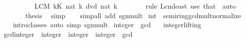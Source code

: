 \begin{isabellebody}
\ \ \isamarkupfalse%
\ {\isacharminus}{\kern0pt}\isanewline
\ \ \ \ \isamarkupfalse%
\ {\isachardoublequoteopen}{\isacharparenleft}{\kern0pt}LCM\ k{\isasymin}K{\isachardot}{\kern0pt}\ nat\ {\isasymbar}k{\isasymbar}{\isacharparenright}{\kern0pt}\ dvd\ nat\ {\isasymbar}k{\isasymbar}{\isachardoublequoteclose}\isanewline
\ \ \ \ \ \ \isamarkupfalse%
\ {\isacharparenleft}{\kern0pt}rule\ Lcm{\isacharunderscore}{\kern0pt}least{\isacharparenright}{\kern0pt}\ {\isacharparenleft}{\kern0pt}use\ that\ \ auto{\isacharparenright}{\kern0pt}\isanewline
\ \ \ \ \isamarkupfalse%
\ \isamarkupfalse%
\ {\isacharquery}{\kern0pt}thesis\ \isamarkupfalse%
\ simp\isanewline
\ \ \isamarkupfalse%
\isanewline
{}\isamarkupfalse%
\ {\isacharparenleft}{\kern0pt}simp{\isacharunderscore}{\kern0pt}all\ add{\isacharcolon}{\kern0pt}\ sgn{\isacharunderscore}{\kern0pt}mult{\isacharparenright}{\kern0pt}%
\endisatagproof
{\isafoldproof}%
%
\isadelimproof
\isanewline
%
\endisadelimproof
\isanewline
{}\isamarkupfalse%
\ int\ {\isacharcolon}{\kern0pt}{\isacharcolon}{\kern0pt}\ semiring{\isacharunderscore}{\kern0pt}gcd{\isacharunderscore}{\kern0pt}mult{\isacharunderscore}{\kern0pt}normalize\isanewline
%
\isadelimproof
\ \ %
\endisadelimproof
%
\isatagproof
{}\isamarkupfalse%
\ intro{\isacharunderscore}{\kern0pt}classes\ {\isacharparenleft}{\kern0pt}auto\ simp{\isacharcolon}{\kern0pt}\ sgn{\isacharunderscore}{\kern0pt}mult{\isacharparenright}{\kern0pt}%
\endisatagproof
{\isafoldproof}%
%
\isadelimproof
%
\endisadelimproof
%
\isadelimdocument
%
\endisadelimdocument
%
\isatagdocument
%
\isamarkuptrue%
%
\endisatagdocument
{\isafolddocument}%
%
\isadelimdocument
%
\endisadelimdocument
{}\isamarkupfalse%
\ integer\ {\isacharcolon}{\kern0pt}{\isacharcolon}{\kern0pt}\ gcd\isanewline
{}\isanewline
\isanewline
{}\isamarkupfalse%
\isanewline
\ \ \ integer{\isachardot}{\kern0pt}lifting\isanewline
{}\isanewline
\isanewline
{}\isamarkupfalse%
\ gcd{\isacharunderscore}{\kern0pt}integer\ {\isacharcolon}{\kern0pt}{\isacharcolon}{\kern0pt}\ {\isachardoublequoteopen}integer\ {\isasymRightarrow}\ integer\ {\isasymRightarrow}\ integer{\isachardoublequoteclose}\ \ gcd%
\isadelimproof
\ %
\endisadelimproof
%
\isatagproof
\isacommand{{\isachardot}{\kern0pt}}\isamarkupfalse%

\end{isabellebody}
